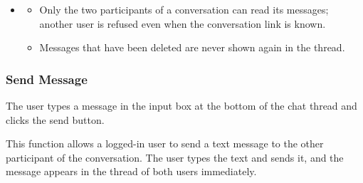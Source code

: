 \begin{itemize}[leftmargin=1.6em,topsep=4pt,itemsep=3pt,parsep=0pt,label=$\bullet$]
        \begin{itemize}[leftmargin=2.2em,topsep=2pt,itemsep=3pt,parsep=0pt,label=$\circ$]
            \item \textbf{Conversation Not Found}: When the conversation no longer exists, the screen shows a not-found state and offers the user a way back to the conversation list.
            \item \textbf{Access Denied}: When the user is not a participant of the conversation, the thread is not opened and a permission message is shown.
            \item \textbf{Cannot Load Messages}: When the messages cannot be loaded, the thread shows a load-failure message so that the user can try again.
            \item \textbf{Lost Connection}: When the connection to the server is lost, the screen shows a ``Lost Connection'' state and asks the user to reconnect.
        \end{itemize}
    \item {}

        \begin{itemize}[leftmargin=2.2em,topsep=2pt,itemsep=3pt,parsep=0pt,label=$\circ$]
            \item Only the two participants of a conversation can read its messages; another user is refused even when the conversation link is known.
            \item Messages that have been deleted are never shown again in the thread.
        \end{itemize}
\end{itemize}


\subsubsection{Send Message}

 The user types a message in the input box at the bottom of the chat thread and clicks the send button.

 This function allows a logged-in user to send a text message to the other participant of the conversation. The user types the text and sends it, and the message appears in the thread of both users immediately.


